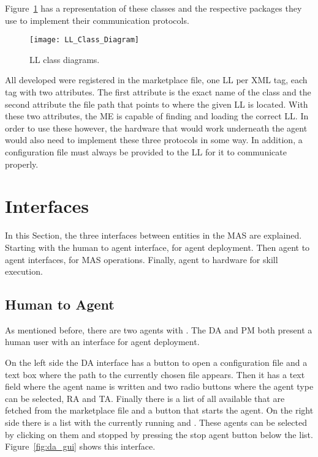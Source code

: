 Figure~\ref{fig:link_library_class_diagram} has a representation of these classes and the respective packages they use to implement their communication protocols.\\

\begin{figure}[h!]
	\centering
	\texttt{[image: LL\_Class\_Diagram]}
	\caption{\acrlong{LL} class diagrams.}
	\label{fig:link_library_class_diagram}
\end{figure}

All developed  were registered in the marketplace file, one \acrshort{LL} per \acrshort{XML} tag, each tag with two attributes. The first attribute is the exact name of the class and the second attribute the file path that points to where the given \acrshort{LL} is located. With these two attributes, the \acrshort{ME} is capable of finding and loading the correct \acrshort{LL}. In order to use these  however, the hardware that would work underneath the agent would also need to implement these three protocols in some way. In addition, a configuration file must always be provided to the \acrshort{LL} for it to communicate properly.

\section{Interfaces}
\label{sec:interfaces}

In this Section, the three interfaces between entities in the \acrshort{MAS} are explained. Starting with the human to agent interface, for agent deployment. Then agent to agent interfaces, for \acrshort{MAS} operations. Finally, agent to hardware for skill execution.

\subsection{Human to Agent}
\label{subsec:human_to_agent_interface}

As mentioned before, there are two agents with . The \acrlong{DA} and \acrlong{PM} both present a human user with an interface for agent deployment.

On the left side the \acrshort{DA} interface has a button to open a configuration file and a text box where the path to the currently chosen file appears. Then it has a text field where the agent name is written and two radio buttons where the agent type can be selected, \acrlong{RA} and \acrlong{TA}. Finally there is a list of all available  that are fetched from the marketplace file and a button that starts the agent. On the right side there is a list with the currently running  and . These agents can be selected by clicking on them and stopped by pressing the stop agent button below the list. Figure~\ref{fig:da_gui} shows this interface.\\

